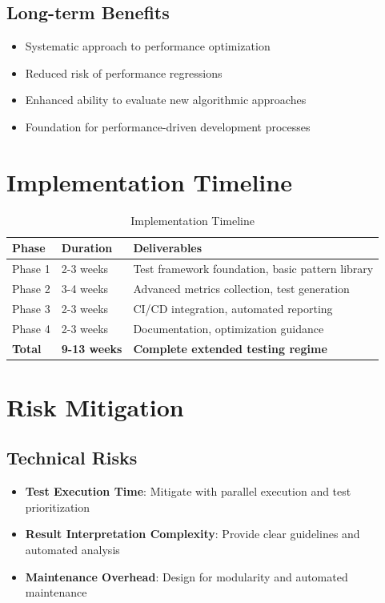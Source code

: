 \documentclass[11pt,a4paper]{article}
\begin{document}
\subsection{Long-term Benefits}

\begin{itemize}
    \item Systematic approach to performance optimization
    \item Reduced risk of performance regressions
    \item Enhanced ability to evaluate new algorithmic approaches
    \item Foundation for performance-driven development processes
\end{itemize}

\section{Implementation Timeline}

\begin{table}[H]
\centering
\begin{tabular}{@{}llp{6cm}@{}}
\toprule
\textbf{Phase} & \textbf{Duration} & \textbf{Deliverables} \\
\midrule
Phase 1 & 2-3 weeks & Test framework foundation, basic pattern library \\
Phase 2 & 3-4 weeks & Advanced metrics collection, test generation \\
Phase 3 & 2-3 weeks & CI/CD integration, automated reporting \\
Phase 4 & 2-3 weeks & Documentation, optimization guidance \\
\midrule
\textbf{Total} & \textbf{9-13 weeks} & \textbf{Complete extended testing regime} \\
\bottomrule
\end{tabular}
\caption{Implementation Timeline}
\label{tab:timeline}
\end{table}

\section{Risk Mitigation}

\subsection{Technical Risks}

\begin{itemize}
    \item \textbf{Test Execution Time}: Mitigate with parallel execution and test prioritization
    \item \textbf{Result Interpretation Complexity}: Provide clear guidelines and automated analysis
    \item \textbf{Maintenance Overhead}: Design for modularity and automated maintenance
\end{itemize}
\end{document}

